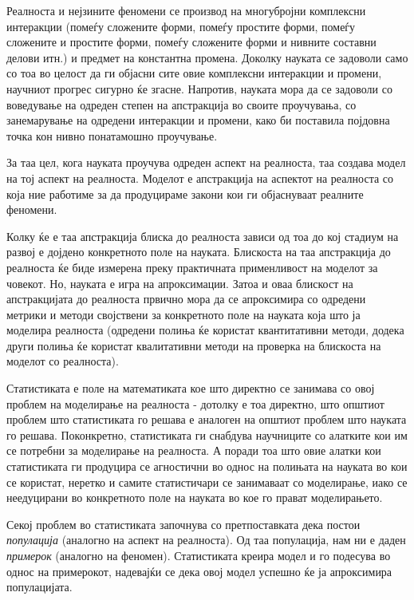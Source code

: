 \documentclass[12pt]{article}
\numberwithin{equation}{section}
\begin{document}
Реалноста и нејзините феномени се производ на многубројни комплексни интеракции (помеѓу сложените форми, помеѓу простите форми, помеѓу сложените и простите форми, помеѓу сложените форми и нивните составни делови итн.) и предмет на константна промена. Доколку науката се задоволи само со тоа во целост да ги објасни сите овие комплексни интеракции и промени, научниот прогрес сигурно ќе згасне. Напротив, науката мора да се задоволи со воведување на одреден степен на апстракција во своите проучувања, со занемарување на одредени интеракции и промени, како би поставила појдовна точка кон нивно понатамошно проучување.

За таа цел, кога науката проучува одреден аспект на реалноста, таа создава модел на тој аспект на реалноста. Моделот е апстракција на аспектот на реалноста со која ние работиме за да продуцираме закони кои ги објаснуваат реалните феномени.

Колку ќе е таа апстракција блиска до реалноста зависи од тоа до кој стадиум на развој е дојдено конкретното поле на науката. Блискоста на таа апстракција до реалноста ќе биде измерена преку практичната применливост на моделот за човекот. Но, науката е игра на апроксимации. Затоа и оваа блискост на апстракцијата до реалноста првично мора да се апроксимира со одредени метрики и методи својствени за конкретното поле на науката која што ја моделира реалноста (одредени полиња ќе користат квантитативни методи, додека други полиња ќе користат квалитативни методи на проверка на блискоста на моделот со реалноста).

Статистиката е поле на математиката кое што директно се занимава со овој проблем на моделирање на реалноста - дотолку е тоа директно, што општиот проблем што статистиката го решава е аналоген на општиот проблем што науката го решава. Поконкретно, статистиката ги снабдува научниците со алатките кои им се потребни за моделирање на реалноста. А поради тоа што овие алатки кои статистиката ги продуцира се агностични во однос на полињата на науката во кои се користат, неретко и самите статистичари се занимаваат со моделирање, иако се неедуцирани во конкретното поле на науката во кое го прават моделирањето.

Секој проблем во статистиката започнува со претпоставката дека постои \textit{популација} (аналогно на аспект на реалноста). Од таа популација, нам ни е даден \textit{примерок} (аналогно на феномен). Статистиката креира модел и го подесува во однос на примерокот, надевајќи се дека овој модел успешно ќе ја апроксимира популацијата.
\end{document}
